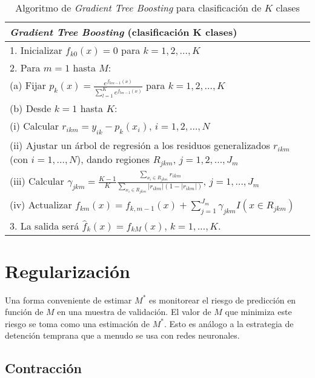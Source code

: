 \begin{table}[H]
\centering
\begin{tabular}{l}
\toprule\toprule
\textbf{\textit{Gradient Tree Boosting} (clasificación K clases)} \\
\midrule\midrule
1. Inicializar $f_{k0}(x) = 0$ para $k = 1, 2, \dots, K$ \\
2. Para $m = 1$ hasta $M$: \\
\quad (a) Fijar $\displaystyle p_k(x) = \frac{e^{f_{km-1}(x)}}{\sum_{l=1}^{K} e^{f_{lm-1}(x)}}$ para $k = 1, 2, \dots, K$ \\
\quad (b) Desde $k = 1$ hasta $K$: \\
\quad \quad (i) Calcular $\displaystyle r_{ikm} = y_{ik} - p_k(x_i)$, $i = 1, 2, \dots, N$ \\
\makecell[l]{\quad \quad (ii) Ajustar un árbol de regresión a los residuos generalizados $r_{ikm}$ (con $i = 1, \dots, N$), \\ \quad \quad \quad \; dando regiones $R_{jkm}$, $j = 1, 2, \dots, J_m$} \\
\quad \quad (iii) Calcular $\displaystyle \gamma_{jkm} = \frac{K - 1}{K} \frac{\sum_{x_i \in R_{jkm}} r_{ikm}}{\sum_{x_i \in R_{jkm}} |r_{ikm}|(1 - |r_{ikm}|)}$, $j = 1, \dots, J_m$ \\
\quad \quad (iv) Actualizar $\displaystyle f_{km}(x) = f_{k,m-1}(x) + \sum_{j=1}^{J_m} \gamma_{jkm} I(x \in R_{jkm})$ \\
3. La salida será $\displaystyle \hat{f}_k(x) = f_{kM}(x)$, $k = 1, \dots, K$. \\
\bottomrule\bottomrule
\end{tabular}
\caption{Algoritmo de \textit{Gradient Tree Boosting} para clasificación de $K$ clases}
\label{tb:10.4}
\end{table}

\section{Regularización}

Una forma conveniente de estimar $M^*$ es monitorear el riesgo de predicción en función de $M$ en una muestra de validación. El valor de $M$ que minimiza este riesgo se toma como una estimación de $M^*$. Esto es análogo a la estrategia de detención temprana que a menudo se usa con redes neuronales.

\subsection{Contracción}

